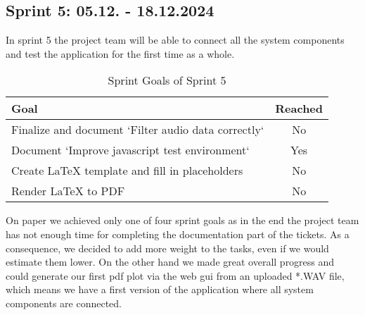 \subsection{Sprint 5: 05.12. - 18.12.2024}\label{subsec:sprint-5}
In sprint 5 the project team will be able to connect all the system components and test the application for the first time as a whole.
\begin{table}[H]
    \centering
    \begin{tabularx}{\textwidth}{X c}
        \toprule
        \textbf{Goal}                                         & \textbf{Reached} \\
        \midrule
        Finalize and document `Filter audio data correctly`   & No               \\
        \midrule
        Document `Improve javascript test environment`        & Yes              \\
        \midrule
        Create LaTeX template and fill in placeholders        & No               \\
        \midrule
        Render LaTeX to PDF                                   & No               \\
        \bottomrule
    \end{tabularx}
    \caption{Sprint Goals of Sprint 5}\label{tab:sprint_goals5}
\end{table}
On paper we achieved only one of four sprint goals as in the end the project team has not enough time for completing
the documentation part of the tickets.
As a consequence, we decided to add more weight to the tasks, even if we would estimate them lower.
On the other hand we made great overall progress and could generate our first pdf plot via the web gui from an uploaded
*.WAV  file, which means we have a first version of the application where all system components are connected.

